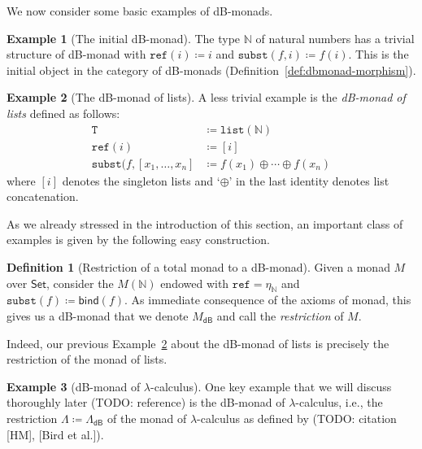 \documentclass[a4paper,twoside,12pt,draft]{article}
\theoremstyle{definition}
\newtheorem{definition}{Definition}
\newtheorem{example}{Example}
\theoremstyle{remark}
\newcommand{\dB}{\mathsf{dB}}
\newcommand{\Category}[1]{\mathsf{#1}}
\newcommand{\SetCat}{\Category{Set}}
\newcommand{\NN}{\mathbb{N}}
\newcommand{\TT}{\mathtt{T}}
\newcommand{\subst}{\mathtt{subst}}
\newcommand{\refe}{\mathtt{ref}}
\begin{document}
We now consider some basic examples of dB-monads.

\begin{example}[The initial dB-monad]
  \label{ex:initial-dbmonad}
  The type $\NN$ of natural numbers has a trivial structure of
  dB-monad with $\refe(i) \coloneqq i$ and
  $\subst(f,i) \coloneqq f(i)$.  This is the initial object in the
  category of dB-monads (Definition~\ref{def:dbmonad-morphism}).
\end{example}

\begin{example}[The dB-monad of lists]
  \label{ex:list-dbmonad}
  A less trivial example is the \emph{dB-monad of lists} defined as
  follows:
  \begin{align*}
    \TT &\coloneqq\mathtt{list}(\NN) \\
    \refe(i) &\coloneqq [i] \\
    \subst(f,[x_1, \dots, x_n] &\coloneqq f(x_1) \oplus \cdots \oplus f(x_n)
  \end{align*}
  where $[i]$ denotes the singleton lists and `$\oplus$' in the last
  identity denotes list concatenation.
\end{example}

As we already stressed in the introduction of this section, an
important class of examples is given by the following easy
construction.

\begin{definition}[Restriction of a total monad to a dB-monad]
  \label{def:dbmonad-restriction}
  Given a monad $M$ over $\SetCat$, consider the $M(\NN)$ endowed with
  $\refe = \eta_\NN$ and $\subst(f) \coloneqq \mathsf{bind}(f)$.  As
  immediate consequence of the axioms of monad, this gives us a
  dB-monad that we denote $M_\dB$ and call the \emph{restriction} of
  $M$.
\end{definition}

Indeed, our previous Example~\ref{ex:list-dbmonad} about the dB-monad of
lists is precisely the restriction of the monad of lists.

\begin{example}[dB-monad of $\lambda$-calculus]
  \label{ex:dbmonad-lambda}
  One key example that we will discuss thoroughly later (TODO:
  reference) is the dB-monad of $\lambda$-calculus, i.e., the
  restriction $\mathtt{\Lambda} \coloneqq \Lambda_\dB$ of the monad of
  $\lambda$-calculus as defined by (TODO: citation [HM], [Bird et
  al.]).
\end{example}
\end{document}
